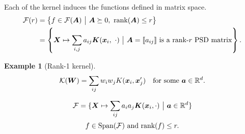 \documentclass[12pt]{article}
\newtheorem{example}{Example}
\begin{document}
\begin{comment}
\begin{alignat}{4}
&\mathbb{R}^{d\times d}\stackrel{\text{feature mapping}}{\longrightarrow} &&\tH^d \stackrel{\text{low-rank projection}}{\longrightarrow}& &\tH^r \stackrel{\text{linear function}}{\longrightarrow} &\mathbb{R}
\\
&\mX\mapsto &&\Phi(\mX) \mapsto&&\Phi(\mX)\mP \mapsto &&\langle \mW, \Phi(\mX)\mP\rangle_{\tH^r}
\end{alignat}
Equivalently, define a family of kernels induced by a given $K$. 
\[
\tF(r)=\left\{ (\mX,\mX')\mapsto \sum_{i,j}a_{ij}K(\mx_i,\mx'_j)\ \big| \ \mA=\entry{a_{ij}} \succeq 0,\ \text{rank}(\mA)\leq r \right\}.
\]
Given a classical kernel $\mK$. Define a positive semi-definite matrix $\mA=\entry{a_{ij}}$, define a kernel in matrix space:
\begin{align}
\tA \colon \mathbb{R}^{d\times d} \times \mathbb{R}^{d\times d} & \to \mathbb{R}\\
(\mX,\mX')&\mapsto \sum_{i,j}a_{ij}K(\mx_i, \mx'_j).
\end{align}
Then $\tA$ is a value kernel defined in matrix space. Now let $\tF(\mA)$ denote the RKHS generated from $\mA$. 
\[
\tF(\mA)=\left\{\mX\mapsto \sum_{ij}a_{ij}\mK(\mx_i,\cdot)\ \big| \ \mX\in\mathbb{R}^{d\times d}\right\}
\]
\end{comment}

Each of the kernel induces the functions defined in matrix space. 
\begin{align}
\tF(r)&=\left\{ f\in\tF(\mA) \ \big| \ \mA  \succeq 0, \ \text{rank}(\mA)\leq r\right\} \\
&=\left\{ \mX\mapsto \sum_{i,j}a_{ij}\mK(\mx_i,\ \cdot) \ \big|  \ \mA=\entry{a_{ij}} \text{ is a rank-$r$ PSD matrix} \right\}.
\end{align}

\begin{example}[Rank-1 kernel] 
\[
\mathcal{K}(\bm{W})=\sum_{ij}w_iw_jK(\bm x_i,\bm x'_j) \quad \text{for some }\bm{a}\in\mathbb{R}^d. 
\]
\end{example}


\[
\mathcal{F}=\{\bm X\mapsto \sum_{ij}a_ia_j\bm K(\bm x_i,\cdot)\ \big| \ \bm{a}\in\mathbb{R}^d\}
\]
\[
f\in \text{Span}(\tF) \ \text{and} \ \text{rank}(f)\leq r. 
\]
\end{document}
